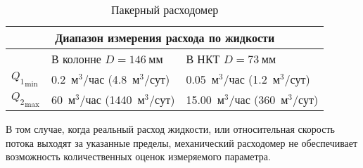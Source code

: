 \begin{table}[h]
\caption{Пакерный расходомер}
\label{table:1}
\begin{tabular}{|l|l|l|}
\hline
\multicolumn{3}{|c|}{Диапазон измерения расхода по жидкости}
\\ \hline
\multicolumn{1}{|l}{}
& В колонне $D = 146~\mathrm{мм}$
& В НКТ $D = 73~\mathrm{мм}$
\\ \hline
${Q_1}_\mathrm{min}$
& 0.2~$\mathrm{м^3/час}$ (4.8~$\mathrm{м^3/сут}$)
& 0.05~$\mathrm{м^3/час}$ (1.2~$\mathrm{м^3/сут}$)
\\ \hline
${Q_2}_\mathrm{max}$
& 60~$\mathrm{м^3/час}$ (1440~$\mathrm{м^3/сут}$)
& 15.00~$\mathrm{м^3/час}$ (360~$\mathrm{м^3/сут}$)
\\ \hline 
\end{tabular}%
\end{table}

\begin{table}[h]
\caption{Беспакерный расходомер}
\label{table:2}
\end{table}

В том случае, когда реальный расход жидкости, или относительная
скорость потока выходят за указанные пределы, механический
расходомер не обеспечивает возможность количественных оценок
измеряемого параметра.

